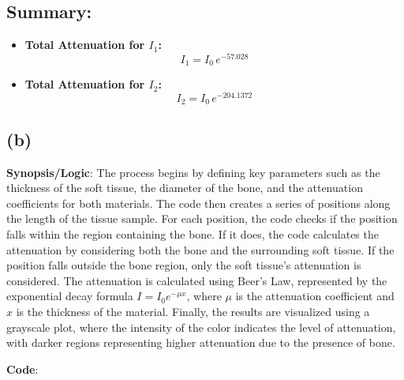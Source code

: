 \documentclass[12pt]{article}
\begin{document}
\subsection*{Summary:}
\begin{itemize}
    \item \textbf{Total Attenuation for $I_1$:}
    \[
    I_1 = I_0 \, e^{-57.028}
    \]

    \item \textbf{Total Attenuation for $I_2$:}
    \[
    I_2 = I_0 \, e^{-204.1372}
    \]
\end{itemize}

\subsection*{(b)}
\textbf{Synopsis/Logic}:
The process begins by defining key parameters such as the thickness of the soft tissue, the diameter of the bone, and the attenuation coefficients for both materials. The code then creates a series of positions along the length of the tissue sample. For each position, the code checks if the position falls within the region containing the bone. If it does, the code calculates the attenuation by considering both the bone and the surrounding soft tissue. If the position falls outside the bone region, only the soft tissue's attenuation is considered. The attenuation is calculated using Beer's Law, represented by the exponential decay formula \( I = I_0 e^{-\mu x} \), where \( \mu \) is the attenuation coefficient and \( x \) is the thickness of the material. Finally, the results are visualized using a grayscale plot, where the intensity of the color indicates the level of attenuation, with darker regions representing higher attenuation due to the presence of bone.


\textbf{Code}:
\end{document}
